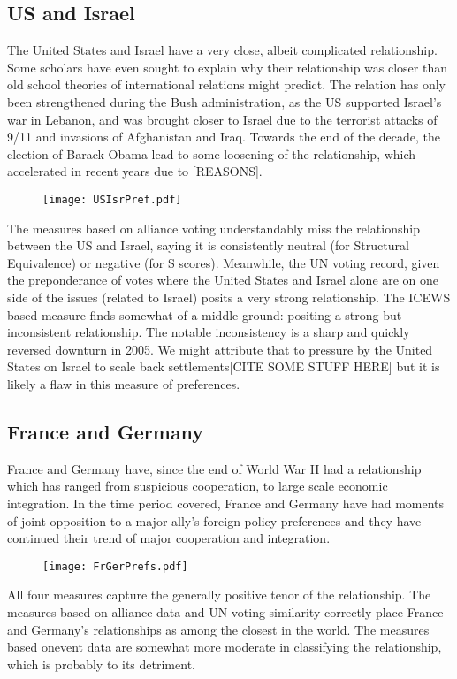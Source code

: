 \documentclass[12pt,onesided,fullpage]{amsart}
\begin{document}
\subsection{US and Israel}
The United States and Israel have a very close, albeit complicated relationship. Some scholars have even sought to explain why their relationship was closer than old school theories of international relations might predict. The relation has only been strengthened during the Bush administration, as the US supported Israel's war in Lebanon, and was brought closer to Israel due to the terrorist attacks of 9/11 and invasions of Afghanistan and Iraq. Towards the end of the decade, the election of Barack Obama lead to some loosening of the relationship, which accelerated in recent years due to [REASONS].

\begin{figure}
\texttt{[image: USIsrPref.pdf]}
\end{figure}

The measures based on alliance voting understandably miss the relationship between the US and Israel, saying it is consistently neutral (for Structural Equivalence) or negative (for S scores). Meanwhile, the UN voting record, given the preponderance of votes where the United States and Israel alone are on one side of the issues (related to Israel) posits a very strong relationship. The ICEWS based measure finds somewhat of a middle-ground: positing a strong but inconsistent relationship. The notable inconsistency is a sharp and quickly reversed downturn in 2005. We might attribute that to pressure by the United States on Israel to scale back settlements[CITE SOME STUFF HERE] but it is likely a flaw in this measure of preferences.

\subsection{France and Germany}
France and Germany have, since the end of World War II had a relationship which has ranged from suspicious cooperation, to large scale economic integration. In the time period covered, France and Germany have had moments of joint opposition to a major ally's foreign policy preferences and they have continued their trend of major cooperation and integration. 

\begin{figure}
\texttt{[image: FrGerPrefs.pdf]}
\end{figure}

All four measures capture the generally positive tenor of the relationship. The measures based on alliance data and UN voting similarity correctly place France and Germany's relationships as among the closest in the world. The measures based onevent data are somewhat more moderate in classifying the relationship, which is probably to its detriment.
\end{document}
